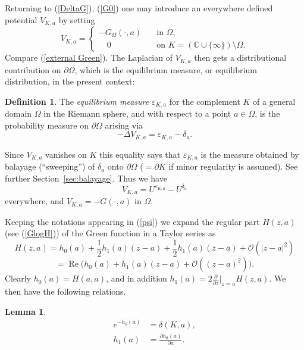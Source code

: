 \documentclass[reqno,12pt]{article}
\theoremstyle{plain}
\newtheorem{lemma}[thm]{Lemma}
\theoremstyle{definition}
\newtheorem{definition}{Definition}[section]
\numberwithin{equation}{section}
\numberwithin{figure}{section}
\DeclareMathOperator{\re}{Re}
\def\C{{\mathbb C}}
\begin{document}
Returning to (\ref{DeltaG}), (\ref{G0}) one may introduce an everywhere defined potential $V_{K,a}$ by setting
\begin{equation}\label{VGK}
V_{K,a}=
\begin{cases}
-G_\Omega (\cdot, a) \quad&\text{in }\Omega,\\
\quad 0 \quad &\text{on } K=(\C\cup\{\infty\})\setminus \Omega.
\end{cases}
\end{equation}
Compare  (\ref{external Green}).
The Laplacian of $V_{K,a}$ then gets a distributional contribution on $\partial \Omega$,
which is the equilibrium measure, or equilibrium distribution, in the present context:
\begin{definition}
The {\it equilibrium measure} $\varepsilon_{K,a}$ for the complement $K$ of a general domain $\Omega$ in the
Riemann sphere, and with respect to a point $a\in\Omega$, is the probability measure on $\partial \Omega$ arising via
\begin{equation}\label{DeltaVK}
-\Delta V_{K,a}= \varepsilon_{K,a}-\delta_a. 
\end{equation}
\end{definition}
Since $V_{K,a}$ vanishes on $K$ this equality says that $\varepsilon_{K,a}$ is the measure  obtained by balayage (``sweeping'')
of $\delta_a$ onto $\partial \Omega$ ($=\partial K$ if minor regularity is assumed).  See further Section~\ref{sec:balayage}. 
Thus we have 
\begin{equation}\label{VUU}
V_{K,a}= U^{\varepsilon_{K,a}}-U^{\delta_a}
\end{equation}
everywhere, and  $V_{K,a}=-G(\cdot,a)$ in $\Omega$.

Keeping the notations appearing in (\ref{psi}) we expand the regular part $H(z,a)$ (see (\ref{GlogH})) of the Green function
in a Taylor series as
$$
H(z,a)=h_0(a)+\frac{1}{2}h_1(a)(z-a)+\frac{1}{2}\overline{h_1(a)}(\bar{z}-\bar{a})+\mathcal{O}(|z-a|^2)
$$
\begin{equation}\label{TaylorH}
=\re \big(h_0(a)+h_1(a)(z-a)+\mathcal{O}((z-a)^2)\big).
\end{equation}
Clearly $h_0(a)=H(a,a)$, and in addition $h_1(a)=2\frac{\partial}{\partial z}|_{z=a}H(z,a)$.
We then have the following relations.
\begin{lemma}\label{lem:hgammadelta}
\begin{align*}\label{eh0delta}
e^{-h_0(a)}&=\delta(K,a),\\
 h_1(a)&=\frac{\partial h_0(a)}{\partial a}.
\end{align*}
\end{lemma}
\end{document}

